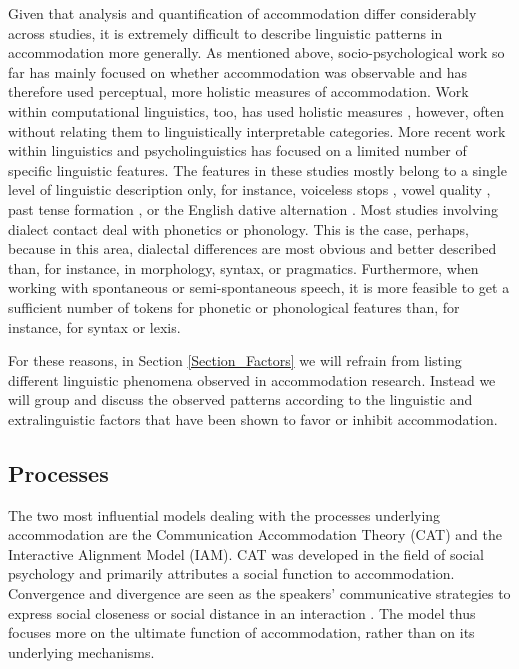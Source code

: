 \documentclass[output=paper]{langscibook}
\begin{document}
Given that analysis and quantification of accommodation differ considerably across studies, it is extremely difficult to describe linguistic patterns in accommodation more generally. As mentioned above, socio-psychological work so far has mainly focused on whether accommodation was observable and has therefore used perceptual, more holistic measures of accommodation. Work within computational linguistics, too, has used holistic measures \citep{lewandowski_talent_2012,de_looze_investigating_2014}, however, often without relating them to linguistically interpretable categories. More recent work within linguistics and psycholinguistics has focused on a limited number of specific linguistic features. The features in these studies mostly belong to a single level of linguistic description only, for instance, voiceless stops \citep{nielsen_specificity_2011}, vowel quality \citep{babel_dialect_2010}, past tense formation \citep{beckner_participants_2016}, or the English dative alternation \citep{weatherholtz_socially-mediated_2014}. Most studies involving dialect contact deal with phonetics or phonology. This is the case, perhaps, because in this area, dialectal differences are most obvious and better described than, for instance, in morphology, syntax, or pragmatics. Furthermore, when working with spontaneous or semi-spontaneous speech, it is more feasible to get a sufficient number of tokens for phonetic or phonological features than, for instance, for syntax or lexis.

For these reasons, in Section \ref{Section_Factors} we will refrain from listing different linguistic phenomena observed in accommodation research. Instead we will group and discuss the observed patterns according to the linguistic and extralinguistic factors that have been shown to favor or inhibit accommodation.

\subsection{Processes}

The two most influential models dealing with the processes underlying accommodation are the Communication Accommodation Theory (CAT) and the Interactive Alignment Model (IAM).
CAT \citep{giles_accent_1973,giles_towards_1973,giles_speech_1975} was developed in the field of social psychology and primarily attributes a social function to accommodation. Convergence and divergence are seen as the speakers' communicative strategies to express social closeness or social distance in an interaction \citep[293]{giles_communication_2007}. The model thus focuses more on the ultimate function of accommodation, rather than on its underlying mechanisms.
\end{document}
